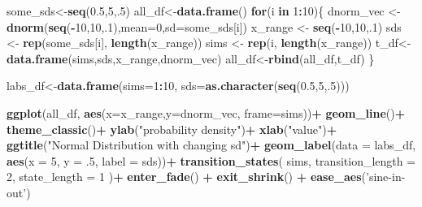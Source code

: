\documentclass[]{book}
\newenvironment{Shaded}{\begin{snugshade}}{\end{snugshade}}
\newcommand{\ControlFlowTok}[1]{\textcolor[rgb]{0.13,0.29,0.53}{\textbf{#1}}}
\newcommand{\DataTypeTok}[1]{\textcolor[rgb]{0.13,0.29,0.53}{#1}}
\newcommand{\DecValTok}[1]{\textcolor[rgb]{0.00,0.00,0.81}{#1}}
\newcommand{\FloatTok}[1]{\textcolor[rgb]{0.00,0.00,0.81}{#1}}
\newcommand{\KeywordTok}[1]{\textcolor[rgb]{0.13,0.29,0.53}{\textbf{#1}}}
\newcommand{\NormalTok}[1]{#1}
\newcommand{\OperatorTok}[1]{\textcolor[rgb]{0.81,0.36,0.00}{\textbf{#1}}}
\newcommand{\StringTok}[1]{\textcolor[rgb]{0.31,0.60,0.02}{#1}}
\begin{document}
\begin{Shaded}
\begin{Highlighting}[]
\NormalTok{some_sds<-}\KeywordTok{seq}\NormalTok{(}\FloatTok{0.5}\NormalTok{,}\DecValTok{5}\NormalTok{,.}\DecValTok{5}\NormalTok{)}
\NormalTok{all_df<-}\KeywordTok{data.frame}\NormalTok{()}
\ControlFlowTok{for}\NormalTok{(i }\ControlFlowTok{in} \DecValTok{1}\OperatorTok{:}\DecValTok{10}\NormalTok{)\{}
\NormalTok{  dnorm_vec <-}\StringTok{ }\KeywordTok{dnorm}\NormalTok{(}\KeywordTok{seq}\NormalTok{(}\OperatorTok{-}\DecValTok{10}\NormalTok{,}\DecValTok{10}\NormalTok{,.}\DecValTok{1}\NormalTok{),}\DataTypeTok{mean=}\DecValTok{0}\NormalTok{,}\DataTypeTok{sd=}\NormalTok{some_sds[i])}
\NormalTok{  x_range   <-}\StringTok{ }\KeywordTok{seq}\NormalTok{(}\OperatorTok{-}\DecValTok{10}\NormalTok{,}\DecValTok{10}\NormalTok{,.}\DecValTok{1}\NormalTok{)}
\NormalTok{  sds <-}\StringTok{ }\KeywordTok{rep}\NormalTok{(some_sds[i], }\KeywordTok{length}\NormalTok{(x_range))}
\NormalTok{  sims <-}\StringTok{ }\KeywordTok{rep}\NormalTok{(i, }\KeywordTok{length}\NormalTok{(x_range))}
\NormalTok{  t_df<-}\KeywordTok{data.frame}\NormalTok{(sims,sds,x_range,dnorm_vec)}
\NormalTok{  all_df<-}\KeywordTok{rbind}\NormalTok{(all_df,t_df)}
\NormalTok{\}}

\NormalTok{labs_df<-}\KeywordTok{data.frame}\NormalTok{(}\DataTypeTok{sims=}\DecValTok{1}\OperatorTok{:}\DecValTok{10}\NormalTok{,}
                    \DataTypeTok{sds=}\KeywordTok{as.character}\NormalTok{(}\KeywordTok{seq}\NormalTok{(}\FloatTok{0.5}\NormalTok{,}\DecValTok{5}\NormalTok{,.}\DecValTok{5}\NormalTok{)))}

\KeywordTok{ggplot}\NormalTok{(all_df, }\KeywordTok{aes}\NormalTok{(}\DataTypeTok{x=}\NormalTok{x_range,}\DataTypeTok{y=}\NormalTok{dnorm_vec, }\DataTypeTok{frame=}\NormalTok{sims))}\OperatorTok{+}
\StringTok{  }\KeywordTok{geom_line}\NormalTok{()}\OperatorTok{+}
\StringTok{  }\KeywordTok{theme_classic}\NormalTok{()}\OperatorTok{+}
\StringTok{  }\KeywordTok{ylab}\NormalTok{(}\StringTok{"probability density"}\NormalTok{)}\OperatorTok{+}
\StringTok{  }\KeywordTok{xlab}\NormalTok{(}\StringTok{"value"}\NormalTok{)}\OperatorTok{+}
\StringTok{  }\KeywordTok{ggtitle}\NormalTok{(}\StringTok{"Normal Distribution with changing sd"}\NormalTok{)}\OperatorTok{+}
\StringTok{  }\KeywordTok{geom_label}\NormalTok{(}\DataTypeTok{data =}\NormalTok{ labs_df, }\KeywordTok{aes}\NormalTok{(}\DataTypeTok{x =} \DecValTok{5}\NormalTok{, }\DataTypeTok{y =} \FloatTok{.5}\NormalTok{, }\DataTypeTok{label =}\NormalTok{ sds))}\OperatorTok{+}
\StringTok{   }\KeywordTok{transition_states}\NormalTok{(}
\NormalTok{    sims,}
    \DataTypeTok{transition_length =} \DecValTok{2}\NormalTok{,}
    \DataTypeTok{state_length =} \DecValTok{1}
\NormalTok{  )}\OperatorTok{+}
\StringTok{  }\KeywordTok{enter_fade}\NormalTok{() }\OperatorTok{+}\StringTok{ }
\StringTok{  }\KeywordTok{exit_shrink}\NormalTok{() }\OperatorTok{+}
\StringTok{  }\KeywordTok{ease_aes}\NormalTok{(}\StringTok{'sine-in-out'}\NormalTok{)}
\end{Highlighting}
\end{Shaded}
\end{document}
